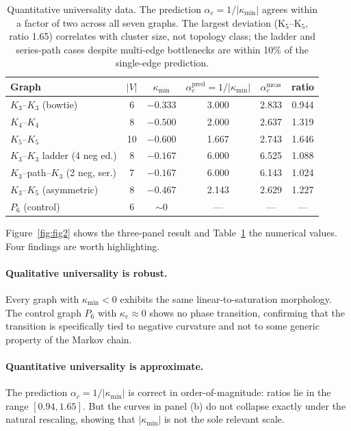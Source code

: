 \documentclass[11pt,letterpaper]{article}
\theoremstyle{definition}
\theoremstyle{remark}
\begin{document}
\begin{table}[t]
\centering
\begin{tabular}{l c c c c c}
\hline\hline
Graph & $|V|$ & $\kappa_{\min}$ &
$\alpha_c^{\mathrm{pred}} = 1/|\kappa_{\min}|$ &
$\alpha_c^{\mathrm{meas}}$ & ratio \\
\hline
$K_3$--$K_3$ (bowtie)            & 6  & $-0.333$ & 3.000 & 2.833 & 0.944 \\
$K_4$--$K_4$                     & 8  & $-0.500$ & 2.000 & 2.637 & 1.319 \\
$K_5$--$K_5$                     & 10 & $-0.600$ & 1.667 & 2.743 & 1.646 \\
$K_3$--$K_3$ ladder (4 neg ed.)  & 8  & $-0.167$ & 6.000 & 6.525 & 1.088 \\
$K_3$--path--$K_3$ (2 neg, ser.) & 7  & $-0.167$ & 6.000 & 6.143 & 1.024 \\
$K_3$--$K_5$ (asymmetric)        & 8  & $-0.467$ & 2.143 & 2.629 & 1.227 \\
$P_6$ (control)                  & 6  & $\sim 0$ & ---   & ---   & ---   \\
\hline\hline
\end{tabular}
\caption{Quantitative universality data. The prediction
$\alpha_c = 1/|\kappa_{\min}|$ agrees within a factor of two across all
seven graphs. The largest deviation (K$_5$--K$_5$, ratio 1.65) correlates
with cluster size, not topology class; the ladder and series-path cases
despite multi-edge bottlenecks are within 10\% of the single-edge prediction.}
\label{tab:universality}
\end{table}

Figure~\ref{fig:fig2} shows the three-panel result and
Table~\ref{tab:universality} the numerical values. Four findings are worth
highlighting.

\paragraph{Qualitative universality is robust.} Every graph with
$\kappa_{\min}<0$ exhibits the same linear-to-saturation morphology. The
control graph $P_6$ with $\kappa_e \approx 0$ shows no phase transition,
confirming that the transition is specifically tied to negative curvature and
not to some generic property of the Markov chain.

\paragraph{Quantitative universality is approximate.} The prediction
$\alpha_c = 1/|\kappa_{\min}|$ is correct in order-of-magnitude: ratios lie
in the range $[0.94, 1.65]$. But the curves in panel (b) do not collapse
exactly under the natural rescaling, showing that $|\kappa_{\min}|$ is not
the sole relevant scale.
\end{document}
